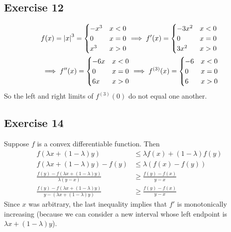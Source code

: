 \subsection{Exercise 12}
\begin{align*}
        &f(x) = \abs{x}^3 = 
        \begin{cases}
                -x^3 & x < 0 \\
                0 & x = 0 \\
                x^3 & x > 0
        \end{cases} \implies 
        f'(x) = 
        \begin{cases}
                -3x^2 & x < 0 \\
                0 & x = 0 \\
                3x^2 & x > 0
        \end{cases} \\
        &\implies f''(x) =
        \begin{cases}
                -6x & x < 0 \\
                0 & x = 0 \\
                6x & x > 0
        \end{cases} \implies 
        f^{(3)}(x) =
        \begin{cases}
                -6 & x < 0 \\
                0 & x = 0 \\
                6 & x > 0 
        \end{cases}
\end{align*}
So the left and right limits of $f^{(3)}(0)$ do not equal one another.

\subsection{Exercise 14}
Suppose $f$ is a convex differentiable function. Then
\begin{align*}
        f(\lambda x + (1 - \lambda) y) &\leq \lambda f(x) + (1 - \lambda) f(y) \\
        f(\lambda x + (1 - \lambda) y) - f(y) &\leq \lambda (f(x) - f(y)) \\
        \frac{f(y) - f(\lambda x + (1 - \lambda) y)}{\lambda (y - x)} &\geq \frac{f(y) - f(x)}{y - x} \\
        \frac{f(y) - f(\lambda x + (1 - \lambda) y)}{y - (\lambda x + (1 - \lambda)y)} &\geq \frac{f(y) - f(x)}{y - x} 
\end{align*}
Since $x$ was arbitrary, the last inequality implies that $f'$ is monotonically increasing (because we can 
consider a new interval whose left endpoint is $\lambda x + (1 - \lambda) y$).

